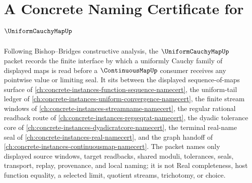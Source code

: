 \chapter{A Concrete Naming Certificate for $\UniformCauchyMapUp$}
\label{ch:concrete-instances-uniform-cauchy-map-namecert}

Following Bishop--Bridges constructive analysis, the $\UniformCauchyMapUp$ packet records the finite interface by which a uniformly Cauchy family of displayed maps is read before a $\ContinuousMapUp$ consumer receives any pointwise value or limiting seal. It sits between the displayed sequence-of-maps surface of \autoref{ch:concrete-instances-function-sequence-namecert}, the uniform-tail ledger of \autoref{ch:concrete-instances-uniform-convergence-namecert}, the finite stream windows of \autoref{ch:concrete-instances-streamname-namecert}, the regular rational readback route of \autoref{ch:concrete-instances-regseqrat-namecert}, the dyadic tolerance core of \autoref{ch:concrete-instances-dyadicratcore-namecert}, the terminal real-name seal of \autoref{ch:concrete-instances-real-namecert}, and the graph handoff of \autoref{ch:concrete-instances-continuousmap-namecert}. The packet names only displayed source windows, target readbacks, shared moduli, tolerances, seals, transport, replay, provenance, and local naming; it is not Real completeness, host function equality, a selected limit, quotient streams, trichotomy, or choice.

